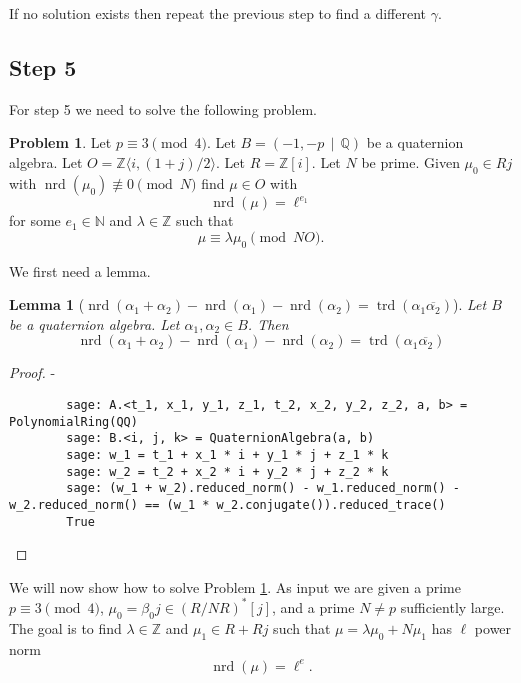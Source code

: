 \documentclass[10pt]{article}
\theoremstyle{plain}
\newtheorem{lemma}[theorem]{Lemma}
\theoremstyle{definition}
\newtheorem{prob}[theorem]{Problem}
\newcommand{\op}{\operatorname}
\newcommand{\N}{\mathbb{N}}
\newcommand{\Z}{\mathbb{Z}}
\newcommand{\Q}{\mathbb{Q}}
\newcommand{\nrd}{\op{nrd}}
\newcommand{\trd}{\op{trd}}
\begin{document}
If no solution exists then repeat the previous step to find a different \( \gamma \).

\subsection{Step 5}
For step 5 we need to solve the following problem.

\begin{prob} \label{prob: mu = lambda * mu_0}
    Let \( p \equiv 3 \pmod{4} \).
    Let \( B =  (-1, -p \, \mid \, \Q) \) be a quaternion algebra.
    Let \( O = \Z \langle i, (1+j) / 2 \rangle \).
    Let \( R = \Z[i] \).
    Let \( N \) be prime.
    Given \( \mu_0 \in Rj \) with \( \nrd(\mu_0) \not\equiv 0 \pmod{N} \) find \( \mu \in O \) with
    \[
        \nrd(\mu) = \ell^{e_1}
    \]
    for some \( e_1 \in \N \) and \(\lambda \in \Z \) such that
    \[
        \mu \equiv \lambda \mu_0 \pmod{NO}.
    \]
\end{prob}

We first need a lemma.
\begin{lemma}[\( \nrd(\alpha_1 + \alpha_2) - \nrd(\alpha_1) - \nrd(\alpha_2) = \trd(\alpha_1 \overline{\alpha_2}) \)]
    Let \( B \) be a quaternion algebra.
    Let \( \alpha_1, \alpha_2 \in B \).
    Then
    \[
        \nrd(\alpha_1 + \alpha_2) - \nrd(\alpha_1) - \nrd(\alpha_2)
        = \trd(\alpha_1 \overline{\alpha_2})
    \]
\end{lemma}
\begin{proof}
    -
    \begin{lstlisting}
        sage: A.<t_1, x_1, y_1, z_1, t_2, x_2, y_2, z_2, a, b> = PolynomialRing(QQ)
        sage: B.<i, j, k> = QuaternionAlgebra(a, b)
        sage: w_1 = t_1 + x_1 * i + y_1 * j + z_1 * k
        sage: w_2 = t_2 + x_2 * i + y_2 * j + z_2 * k
        sage: (w_1 + w_2).reduced_norm() - w_1.reduced_norm() - w_2.reduced_norm() == (w_1 * w_2.conjugate()).reduced_trace()
        True
    \end{lstlisting}
\end{proof}


We will now show how to solve Problem \ref{prob: mu = lambda * mu_0}.
As input we are given a prime \( p \equiv 3 \pmod{4} \), \( \mu_0 = \beta_0j \in (R / NR)^*[j] \), and a prime \( N \neq p \) sufficiently large.
The goal is to find \( \lambda \in \Z \) and \( \mu_1 \in  R + Rj \) such that \( \mu = \lambda \mu_0 + N \mu_1 \) has \( \ell \) power norm
\[
    \nrd(\mu) = \ell^e.
\]
\end{document}
